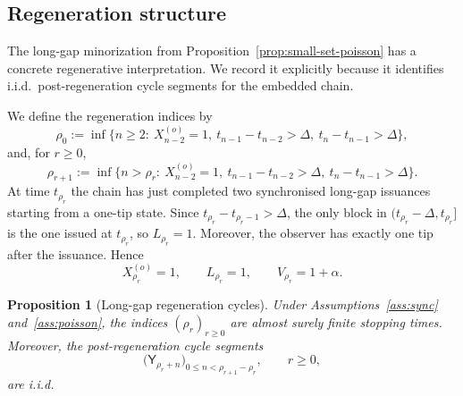 \documentclass[a4paper,12pt,oneside,reqno]{amsart}
\newcommand{\1}{{\mathbf 1}}
\newtheorem{prop}[theo]{Proposition}
\begin{document}
\subsection{Regeneration structure}

The long-gap minorization from Proposition~\ref{prop:small-set-poisson} has a concrete regenerative interpretation. We record it explicitly because it identifies i.i.d.\ post-regeneration cycle segments for the embedded chain.

We define the regeneration indices by
\begin{equation}\label{eq:rho_r}
   \rho_0
   :=
   \inf\{n\ge 2:\ X_{n-2}^{(o)}=1,\ t_{n-1}-t_{n-2}>\Delta,\ t_n-t_{n-1}>\Delta\},
\end{equation}
and, for $r\ge0$,
\begin{equation}\label{eq:rho_r_plus}
   \rho_{r+1}
   :=
   \inf\{n>\rho_r:\ X_{n-2}^{(o)}=1,\ t_{n-1}-t_{n-2}>\Delta,\ t_n-t_{n-1}>\Delta\}.
\end{equation}
At time $t_{\rho_r}$ the chain has just completed two synchronised long-gap issuances starting from a one-tip state. Since $t_{\rho_r}-t_{\rho_r-1}>\Delta$, the only block in $(t_{\rho_r}-\Delta,t_{\rho_r}]$ is the one issued at $t_{\rho_r}$, so $L_{\rho_r}=1$. Moreover, the observer has exactly one tip after the issuance. Hence
\begin{equation}\label{eq:regen-state}
   X_{\rho_r}^{(o)}=1,\qquad L_{\rho_r}=1,\qquad V_{\rho_r}=1+\alpha.
\end{equation}

\begin{prop}[Long-gap regeneration cycles]\label{prop:regeneration-poisson}
Under Assumptions~\ref{ass:sync} and~\ref{ass:poisson}, the indices $(\rho_r)_{r\ge0}$ are almost surely finite stopping times. Moreover, the post-regeneration cycle segments
\[
   \bigl(\mathsf{Y}_{\rho_r+n}\bigr)_{0\le n<\rho_{r+1}-\rho_r},
   \qquad r\ge0,
\]
are i.i.d.
\end{prop}
\end{document}
